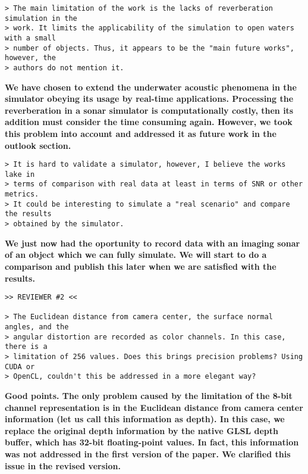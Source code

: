 \documentclass{article}
\begin{document}
\begin{verbatim}
> The main limitation of the work is the lacks of reverberation simulation in the
> work. It limits the applicability of the simulation to open waters with a small
> number of objects. Thus, it appears to be the "main future works", however, the
> authors do not mention it.
\end{verbatim}

\textbf{We have chosen to extend the underwater acoustic phenomena in the
simulator obeying its usage by real-time applications. Processing the
reverberation in a sonar simulator is computationally costly, then its
addition must consider the time consuming again. However, we took this problem
into account and addressed it as future work in the outlook section.}

\begin{verbatim}
> It is hard to validate a simulator, however, I believe the works lake in
> terms of comparison with real data at least in terms of SNR or other metrics.
> It could be interesting to simulate a "real scenario" and compare the results
> obtained by the simulator.
\end{verbatim}

\textbf{We just now had the oportunity to record data with an imaging sonar of an object which we can 
fully simulate. We will start to do a comparison and publish this later when we are satisfied with the 
results.}

\begin{verbatim}
>> REVIEWER #2 <<

> The Euclidean distance from camera center, the surface normal angles, and the
> angular distortion are recorded as color channels. In this case, there is a
> limitation of 256 values. Does this brings precision problems? Using CUDA or
> OpenCL, couldn't this be addressed in a more elegant way?
\end{verbatim}


\textbf{Good points. The only problem caused by the limitation of the 8-bit channel
representation is in the Euclidean distance from camera center information (let us call
this information as depth). In this case, we replace the original depth information by
the native GLSL depth buffer, which has 32-bit floating-point values. In fact, this
information was not addressed in the first version of the paper. We clarified this issue
in the revised version. }
\end{document}
